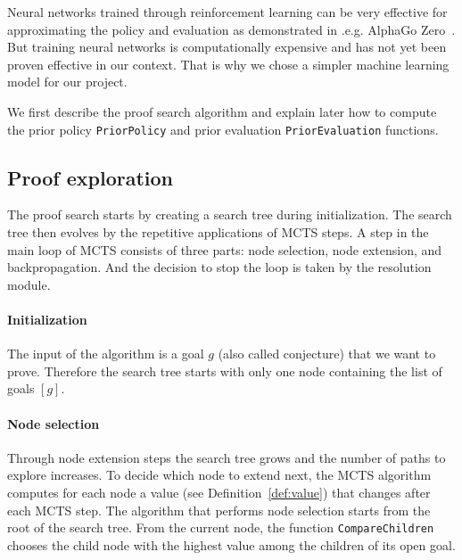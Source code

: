 \documentclass[runningheads,a4paper,draft]{svjour3}
\begin{document}
\begin{remark}
Neural networks trained through reinforcement learning can be 
very effective for approximating the policy and evaluation as demonstrated in 
.e.g. AlphaGo Zero~\cite{silver2017mastering}. 
But training neural networks is 
computationally expensive and has not yet been 
proven effective in our context. That is why we chose a simpler machine 
learning model for our project.
\end{remark}

We first describe the proof search algorithm and explain later how to compute
the prior policy \texttt{PriorPolicy} and prior evaluation
\texttt{PriorEvaluation} functions.

\subsection{Proof exploration}

The proof search starts by creating a search tree during initialization. 
The search tree then evolves by the repetitive applications of MCTS steps. A 
step in the main loop of MCTS consists of three parts: node selection, node 
extension, and backpropagation. And the decision to stop the loop is taken 
by the resolution module.

\paragraph{Initialization}
The input of the algorithm is a goal $g$ (also called conjecture) that we
want to prove. Therefore the search tree starts with only one node containing
the list of goals
$[g]$.


\paragraph{Node selection}
Through node extension steps the search tree grows and the number of paths to
explore increases. To decide which node to extend next, the MCTS algorithm
computes for each node a value (see Definition~\ref{def:value}) that changes
after each MCTS step. 
The algorithm that performs
node selection starts from the root of the search tree. From the current node,
the function \texttt{CompareChildren} chooses the child node with the highest 
value among the children of its open goal.
\end{document}
